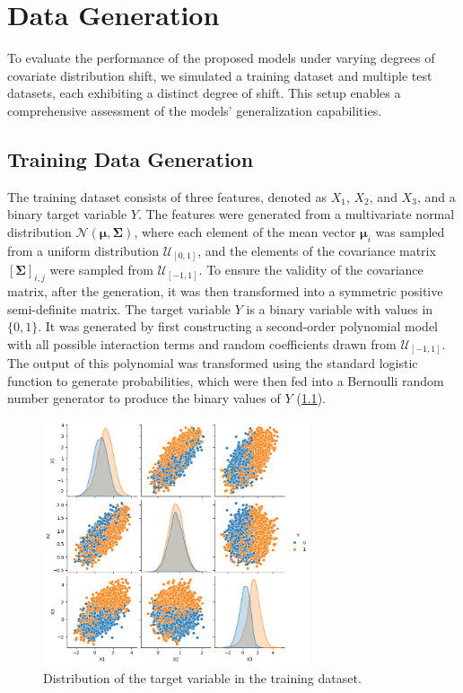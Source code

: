 \chapter{Data Generation}

To evaluate the performance of the proposed models under varying degrees of covariate distribution shift, we simulated a training dataset and multiple test datasets, each exhibiting a distinct degree of shift. This setup enables a comprehensive assessment of the models’ generalization capabilities.

\section{Training Data Generation}

The training dataset consists of three features, denoted as $X_1$, $X_2$, and $X_3$, and a binary target variable $Y$. The features were generated from a multivariate normal distribution $\mathcal{N}(\boldsymbol{\mu}, \boldsymbol{\Sigma})$, where each element of the mean vector $\boldsymbol{\mu}_i$ was sampled from a uniform distribution $\mathcal{U}_{[0, 1]}$, and the elements of the covariance matrix $[\boldsymbol{\Sigma}]_{i,j}$ were sampled from $\mathcal{U}_{[-1, 1]}$. To ensure the validity of the covariance matrix, after the generation, it was then transformed into a symmetric positive semi-definite matrix.
The target variable $Y$ is a binary variable with values in $\{0, 1\}$. It was generated by first constructing a second-order polynomial model with all possible interaction terms and random coefficients drawn from $\mathcal{U}_{[-1, 1]}$. The output of this polynomial was transformed using the standard logistic function to generate probabilities, which were then fed into a Bernoulli random number generator to produce the binary values of $Y$ (\cref{fig:label_dist_train}).

\begin{figure}[H]
    \centering
    \includegraphics[width=0.7\textwidth]{assets/label_dist_train.png}
    \caption{Distribution of the target variable in the training dataset.}
    \label{fig:label_dist_train}
\end{figure}

